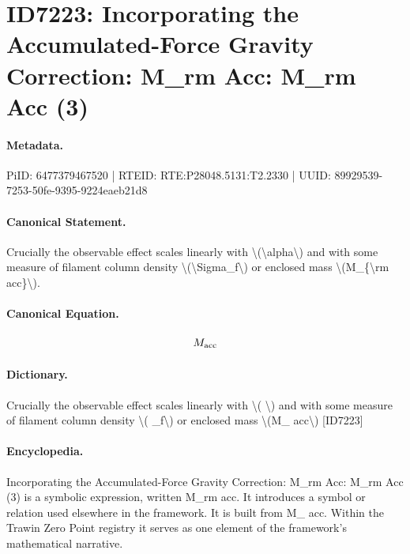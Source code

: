 \section*{ID7223: Incorporating the Accumulated-Force Gravity Correction: M\_rm Acc: M\_rm Acc (3)}
\paragraph{Metadata.}
PiID: 6477379467520 | RTEID: RTE:P28048.5131:T2.2330 | UUID: 89929539-7253-50fe-9395-9224eaeb21d8

\paragraph{Canonical Statement.}
Crucially the observable effect scales linearly with \textbackslash{}(\textbackslash{}alpha\textbackslash{}) and with some measure of filament column density \textbackslash{}(\textbackslash{}Sigma\_f\textbackslash{}) or enclosed mass \textbackslash{}(M\_\{\textbackslash{}rm acc\}\textbackslash{}).

\paragraph{Canonical Equation.}
\[
M_{\rm acc}
\]

\paragraph{Dictionary.}
Crucially the observable effect scales linearly with \textbackslash{}( \textbackslash{}) and with some measure of filament column density \textbackslash{}( \_f\textbackslash{}) or enclosed mass \textbackslash{}(M\_ acc\textbackslash{}) [ID7223]

\paragraph{Encyclopedia.}
Incorporating the Accumulated-Force Gravity Correction: M\_rm Acc: M\_rm Acc (3) is a symbolic expression, written M\_rm acc. It introduces a symbol or relation used elsewhere in the framework. It is built from M\_ acc. Within the Trawin Zero Point registry it serves as one element of the framework's mathematical narrative.

